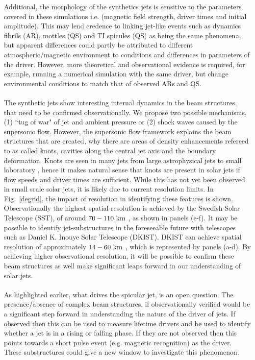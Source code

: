 \documentclass[12pt]{ociamthesis}
\newcommand{\np}{\\ \\}
\begin{document}
Additional, the morphology of the synthetics jets is sensitive to the parameters covered in these simulations i.e. (magnetic field strength, driver times and initial amplitude). This may lend credence to linking jet-like events such as dynamics fibrils (AR), mottles (QS) and TI spicules (QS) as being the same phenomena, but apparent differences could partly be attributed to different atmospheric/magnetic environment to conditions and differences in parameters of the driver. However, more theoretical and observational evidence is required, for example, running a numerical simulation with the same driver, but change environmental conditions to match that of observed ARs and QS. \np
%
The synthetic jets show interesting internal dynamics in the beam structures, that need to be confirmed observationally. We propose two possible mechanisms, (1) ``tug of war" of jet and ambient pressure or (2) shock waves caused by the supersonic flow. However, the supersonic flow framework explains the beam structures that are created, why there are areas of density enhancements refereed to as called knots, cavities along the central jet axis and the boundary deformation. Knots are seen in many jets from large astrophysical jets \citep{van_Putten_1996ApJ467L57V, DeGouveiaDalPino2005, Hada2013ApJ77570H, Cohen2014ApJ787151C, Hervet2017AnA606A103H} to small laboratory \citep{Menon2010, Edgington-Mitchell2014, Ono2014}, hence it makes natural sense that knots are present in solar jets if flow speeds and driver times are sufficient. While this has not yet been observed in small scale solar jets, it is likely due to current resolution limits. In Fig.~\ref{degrid}, the impact of resolution in identifying these features is shown. Observationally the highest spatial resolution is achieved by the Swedish Solar Telescope (SST), of around $70-110~\rm{km}$ \citep{Scharmer2003SPIE4853341S,Berger2003ApJ}, as shown in panels (e-f). It may be possible to identify jet-substructures in the foreseeable future with telescopes such as Daniel K. Inouye Solar Telescope (DKIST). DKIST can achieve spatial resolution of approximately $14-60~\rm{km}$ \citep{Rast2020arXiv,Rimmele2020SoPh}, which is represented by panels (a-d). By achieving higher observational resolution, it will be possible to confirm these beam structures as well make significant leaps forward in our understanding of solar jets. \np
%
As highlighted earlier, what drives the spicular jet, is an open question. The presence/absence of complex beam structures, if observationally verified would be a significant step forward in understanding the nature of the driver of jets. If observed then this can be used to measure lifetime drivers and be used to identify whether a jet is in a rising or falling phase. If they are not observed then this points towards a short pulse event (e.g. magnetic recognition) as the driver. These substructures could give a new window to investigate this phenomenon.
\end{document}
